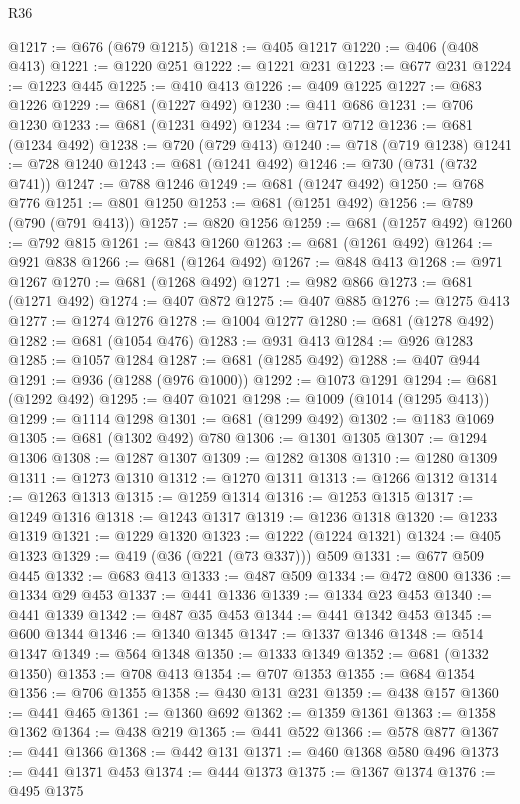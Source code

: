 \begin{lexlean}{R36}
\begin{coremodule}
{{{{{{{{{{{{{{{{{{{{{{{{{{{{{{{{{{{{{{{{{{{{{{{{{{{{{{{{{{{{{{{{{{{{{{{{{{{{{{{{{{@1217 := @676 (@679 @1215)
@1218 := @405 @1217
@1220 := @406 (@408 @413)
@1221 := @1220 @251
@1222 := @1221 @231
@1223 := @677 @231
@1224 := @1223 @445
@1225 := @410 @413
@1226 := @409 @1225
@1227 := @683 @1226
@1229 := @681 (@1227 @492)
@1230 := @411 @686
@1231 := @706 @1230
@1233 := @681 (@1231 @492)
@1234 := @717 @712
@1236 := @681 (@1234 @492)
@1238 := @720 (@729 @413)
@1240 := @718 (@719 @1238)
@1241 := @728 @1240
@1243 := @681 (@1241 @492)
@1246 := @730 (@731 (@732 @741))
@1247 := @788 @1246
@1249 := @681 (@1247 @492)
@1250 := @768 @776
@1251 := @801 @1250
@1253 := @681 (@1251 @492)
@1256 := @789 (@790 (@791 @413))
@1257 := @820 @1256
@1259 := @681 (@1257 @492)
@1260 := @792 @815
@1261 := @843 @1260
@1263 := @681 (@1261 @492)
@1264 := @921 @838
@1266 := @681 (@1264 @492)
@1267 := @848 @413
@1268 := @971 @1267
@1270 := @681 (@1268 @492)
@1271 := @982 @866
@1273 := @681 (@1271 @492)
@1274 := @407 @872
@1275 := @407 @885
@1276 := @1275 @413
@1277 := @1274 @1276
@1278 := @1004 @1277
@1280 := @681 (@1278 @492)
@1282 := @681 (@1054 @476)
@1283 := @931 @413
@1284 := @926 @1283
@1285 := @1057 @1284
@1287 := @681 (@1285 @492)
@1288 := @407 @944
@1291 := @936 (@1288 (@976 @1000))
@1292 := @1073 @1291
@1294 := @681 (@1292 @492)
@1295 := @407 @1021
@1298 := @1009 (@1014 (@1295 @413))
@1299 := @1114 @1298
@1301 := @681 (@1299 @492)
@1302 := @1183 @1069
@1305 := @681 (@1302 @492) @780
@1306 := @1301 @1305
@1307 := @1294 @1306
@1308 := @1287 @1307
@1309 := @1282 @1308
@1310 := @1280 @1309
@1311 := @1273 @1310
@1312 := @1270 @1311
@1313 := @1266 @1312
@1314 := @1263 @1313
@1315 := @1259 @1314
@1316 := @1253 @1315
@1317 := @1249 @1316
@1318 := @1243 @1317
@1319 := @1236 @1318
@1320 := @1233 @1319
@1321 := @1229 @1320
@1323 := @1222 (@1224 @1321)
@1324 := @405 @1323
@1329 := @419 (@36 (@221 (@73 @337))) @509
@1331 := @677 @509 @445
@1332 := @683 @413
@1333 := @487 @509
@1334 := @472 @800
@1336 := @1334 @29 @453
@1337 := @441 @1336
@1339 := @1334 @23 @453
@1340 := @441 @1339
@1342 := @487 @35 @453
@1344 := @441 @1342 @453
@1345 := @600 @1344
@1346 := @1340 @1345
@1347 := @1337 @1346
@1348 := @514 @1347
@1349 := @564 @1348
@1350 := @1333 @1349
@1352 := @681 (@1332 @1350)
@1353 := @708 @413
@1354 := @707 @1353
@1355 := @684 @1354
@1356 := @706 @1355
@1358 := @430 @131 @231
@1359 := @438 @157
@1360 := @441 @465
@1361 := @1360 @692
@1362 := @1359 @1361
@1363 := @1358 @1362
@1364 := @438 @219
@1365 := @441 @522
@1366 := @578 @877
@1367 := @441 @1366
@1368 := @442 @131
@1371 := @460 @1368 @580 @496
@1373 := @441 @1371 @453
@1374 := @444 @1373
@1375 := @1367 @1374
@1376 := @495 @1375
}}}}}}}}}}}}}}}}}}}}}}}}}}}}}}}}}}}}}}}}}}}}}}}}}}}}}}}}}}}}}}}}}}}}}}}}}}}}}}}}}}
\end{coremodule}
\end{lexlean}
